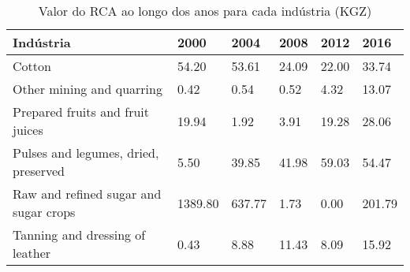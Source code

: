 \begin{table}
\centering
\caption{Valor do RCA ao longo dos anos para cada indústria (KGZ)}
\label{tab:ex3-tempo-KGZ}
\begin{tabular}{p{6cm}p{1.5cm}p{1.5cm}p{1.5cm}p{1.5cm}p{1.5cm}}
\toprule
                            Indústria &    2000 &   2004 &  2008 &  2012 &   2016 \\
\midrule
                               Cotton &   54.20 &  53.61 & 24.09 & 22.00 &  33.74 \\
            Other mining and quarring &    0.42 &   0.54 &  0.52 &  4.32 &  13.07 \\
     Prepared fruits and fruit juices &   19.94 &   1.92 &  3.91 & 19.28 &  28.06 \\
 Pulses and legumes, dried, preserved &    5.50 &  39.85 & 41.98 & 59.03 &  54.47 \\
Raw and refined sugar and sugar crops & 1389.80 & 637.77 &  1.73 &  0.00 & 201.79 \\
      Tanning and dressing of leather &    0.43 &   8.88 & 11.43 &  8.09 &  15.92 \\
\bottomrule
\end{tabular}
\end{table}
